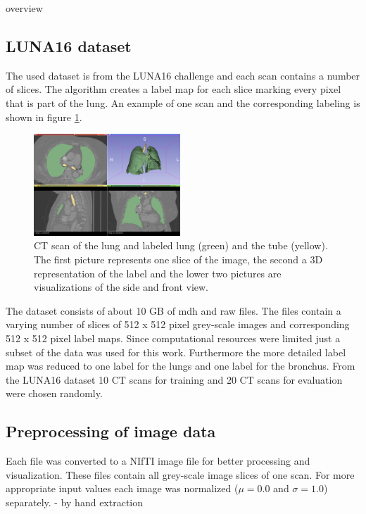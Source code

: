 
overview

\subsection{LUNA16 dataset}

The used dataset is from the LUNA16 challenge and each scan contains a number of slices. The algorithm creates a label map for each slice marking every pixel that is part of the lung. An example of one scan and the corresponding labeling is shown in figure \ref{scan_picture}.

\begin{figure}[h!]
	\includegraphics[width=0.49\textwidth, angle=0]{files/Fulllayoutprediction.png}
	\caption{CT scan of the lung and labeled lung (green) and the tube (yellow). The first picture represents one slice of the image, the second a 3D representation of the label and the lower two pictures are visualizations of the side and front view.}
	\label{scan_picture}
\end{figure}

The dataset consists of about 10 GB of mdh and raw files. The files contain a varying number of slices of 512 x 512 pixel grey-scale images and corresponding 512 x 512 pixel label maps. Since computational resources were limited just a subset of the data was used for this work. Furthermore the more detailed label map was reduced to one label for the lungs and one label for the bronchus.\newline
From the LUNA16 dataset 10 CT scans for training and 20 CT scans for evaluation were chosen randomly.

\subsection{Preprocessing of image data}
Each file was converted to a NIfTI image file for better processing and visualization. These files contain all grey-scale image slices of one scan. For more appropriate input values each image was normalized ($\mu = 0.0$ and $\sigma = 1.0$) separately.
- by hand extraction

